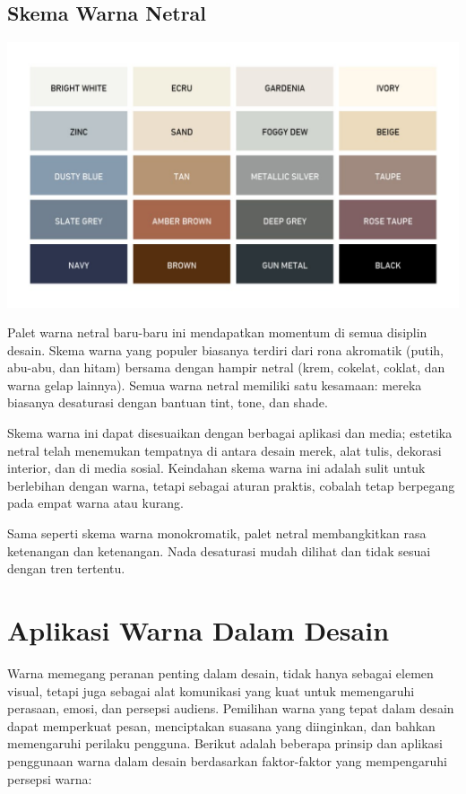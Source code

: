 \documentclass[a4paper]{article}
\begin{document}
\subsection{Skema Warna Netral}
\begin{center}
  \includegraphics[width=\textwidth]{resources/netral.jpg}
\end{center}
Palet warna netral baru-baru ini mendapatkan momentum di semua disiplin desain. Skema warna yang populer biasanya terdiri dari rona akromatik (putih, abu-abu, dan hitam) bersama dengan hampir netral (krem, cokelat, coklat, dan warna gelap lainnya). Semua warna netral memiliki satu kesamaan: mereka biasanya desaturasi dengan bantuan tint, tone, dan shade.

Skema warna ini dapat disesuaikan dengan berbagai aplikasi dan media; estetika netral telah menemukan tempatnya di antara desain merek, alat tulis, dekorasi interior, dan di media sosial. Keindahan skema warna ini adalah sulit untuk berlebihan dengan warna, tetapi sebagai aturan praktis, cobalah tetap berpegang pada empat warna atau kurang.

Sama seperti skema warna monokromatik, palet netral membangkitkan rasa ketenangan dan ketenangan. Nada desaturasi mudah dilihat dan tidak sesuai dengan tren tertentu.

\section{Aplikasi Warna Dalam Desain}
Warna memegang peranan penting dalam desain, tidak hanya sebagai elemen visual, tetapi juga sebagai alat komunikasi yang kuat untuk memengaruhi perasaan, emosi, dan persepsi audiens. Pemilihan warna yang tepat dalam desain dapat memperkuat pesan, menciptakan suasana yang diinginkan, dan bahkan memengaruhi perilaku pengguna. Berikut adalah beberapa prinsip dan aplikasi penggunaan warna dalam desain berdasarkan faktor-faktor yang mempengaruhi persepsi warna:
\end{document}
